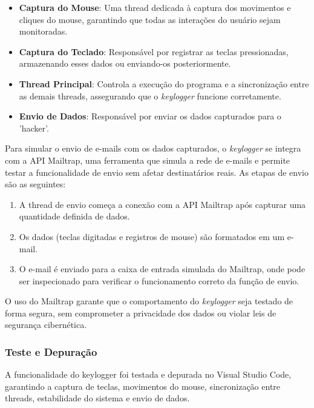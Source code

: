 \documentclass[12pt]{article}
\begin{document}
\begin{itemize}
    \item \textbf{Captura do Mouse}: Uma thread dedicada à captura dos movimentos e cliques do mouse, garantindo que todas as interações do usuário sejam monitoradas.
    \item \textbf{Captura do Teclado}: Responsável por registrar as teclas pressionadas, armazenando esses dados ou enviando-os posteriormente.
    \item \textbf{Thread Principal}: Controla a execução do programa e a sincronização entre as demais threads, assegurando que o \textit{keylogger} funcione corretamente.
    \item \textbf{Envio de Dados}: Responsável por enviar os dados capturados para o 'hacker'.
\end{itemize}

Para simular o envio de e-mails com os dados capturados, o \textit{keylogger} se integra com a API Mailtrap, uma ferramenta que simula a rede de e-mails e permite testar a funcionalidade de envio sem afetar destinatários reais. As etapas de envio são as seguintes:

\begin{enumerate}
    \item A thread de envio começa a conexão com a API Mailtrap após capturar uma quantidade definida de dados.
    \item Os dados (teclas digitadas e registros de mouse) são formatados em um e-mail.
    \item O e-mail é enviado para a caixa de entrada simulada do Mailtrap, onde pode ser inspecionado para verificar o funcionamento correto da função de envio.
\end{enumerate}

O uso do Mailtrap garante que o comportamento do \textit{keylogger} seja testado de forma segura, sem comprometer a privacidade dos dados ou violar leis de segurança cibernética.

\subsubsection{Teste e Depuração}

A funcionalidade do keylogger foi testada e depurada no Visual Studio Code, garantindo a captura de teclas, movimentos do mouse, sincronização entre threads, estabilidade do sistema e envio de dados.
\end{document}
